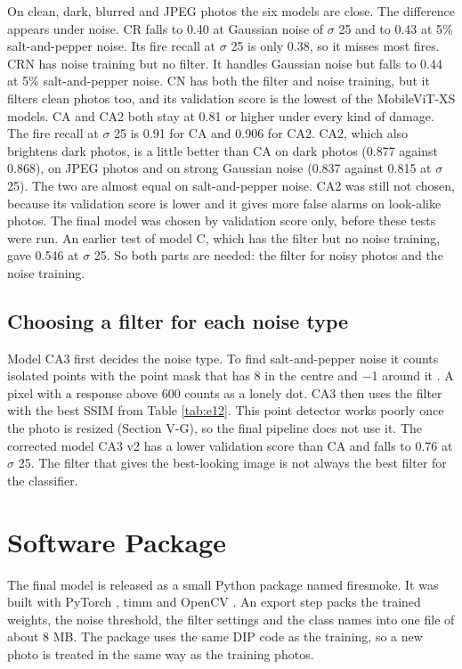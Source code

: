 \documentclass[10pt,twocolumn,letterpaper]{article}
\begin{document}
On clean, dark, blurred and JPEG photos the six models are close. The difference appears under noise. CR falls to 0.40 at Gaussian noise of $\sigma$ 25 and to 0.43 at 5\% salt-and-pepper noise. Its fire recall at $\sigma$ 25 is only 0.38, so it misses most fires. CRN has noise training but no filter. It handles Gaussian noise but falls to 0.44 at 5\% salt-and-pepper noise. CN has both the filter and noise training, but it filters clean photos too, and its validation score is the lowest of the MobileViT-XS models. CA and CA2 both stay at 0.81 or higher under every kind of damage. The fire recall at $\sigma$ 25 is 0.91 for CA and 0.906 for CA2. CA2, which also brightens dark photos, is a little better than CA on dark photos (0.877 against 0.868), on JPEG photos and on strong Gaussian noise (0.837 against 0.815 at $\sigma$ 25). The two are almost equal on salt-and-pepper noise. CA2 was still not chosen, because its validation score is lower and it gives more false alarms on look-alike photos. The final model was chosen by validation score only, before these tests were run. An earlier test of model C, which has the filter but no noise training, gave 0.546 at $\sigma$ 25. So both parts are needed: the filter for noisy photos and the noise training.

\subsection{Choosing a filter for each noise type}
Model CA3 first decides the noise type. To find salt-and-pepper noise it counts isolated points with the point mask that has 8 in the centre and $-$1 around it \cite{gonzalez}. A pixel with a response above 600 counts as a lonely dot. CA3 then uses the filter with the best SSIM from Table \ref{tab:e12}. This point detector works poorly once the photo is resized (Section V-G), so the final pipeline does not use it. The corrected model CA3 v2 has a lower validation score than CA and falls to 0.76 at $\sigma$ 25. The filter that gives the best-looking image is not always the best filter for the classifier.


\section{Software Package}
The final model is released as a small Python package named firesmoke. It was built with PyTorch \cite{pytorch}, timm \cite{timm} and OpenCV \cite{opencv}. An export step packs the trained weights, the noise threshold, the filter settings and the class names into one file of about 8 MB. The package uses the same DIP code as the training, so a new photo is treated in the same way as the training photos.
\end{document}
